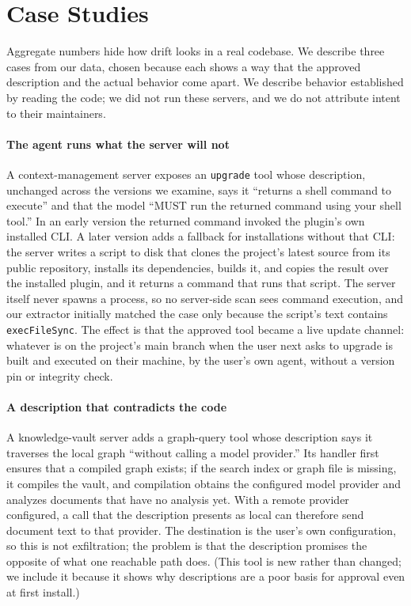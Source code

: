 \section{Case Studies}\label{sec:cases}

Aggregate numbers hide how drift looks in a real codebase. We describe three cases from our data, chosen because each shows a way that the approved description and the actual behavior come apart. We describe behavior established by reading the code; we did not run these servers, and we do not attribute intent to their maintainers. 

\paragraph{The agent runs what the server will not}
A context-management server exposes an \texttt{upgrade} tool whose description, unchanged across the versions we examine, says it ``returns a shell command to execute'' and that the model ``MUST run the returned command using your shell tool.'' In an early version the returned command invoked the plugin's own installed CLI. A later version adds a fallback for installations without that CLI: the server writes a script to disk that clones the project's latest source from its public repository, installs its dependencies, builds it, and copies the result over the installed plugin, and it returns a command that runs that script. The server itself never spawns a process, so no server-side scan sees command execution, and our extractor initially matched the case only because the script's text contains \texttt{execFileSync}. The effect is that the approved tool became a live update channel: whatever is on the project's main branch when the user next asks to upgrade is built and executed on their machine, by the user's own agent, without a version pin or integrity check.

\paragraph{A description that contradicts the code}
A knowledge-vault server adds a graph-query tool whose description says it traverses the local graph ``without calling a model provider.'' Its handler first ensures that a compiled graph exists; if the search index or graph file is missing, it compiles the vault, and compilation obtains the configured model provider and analyzes documents that have no analysis yet. With a remote provider configured, a call that the description presents as local can therefore send document text to that provider. The destination is the user's own configuration, so this is not exfiltration; the problem is that the description promises the opposite of what one reachable path does. (This tool is new rather than changed; we include it because it shows why descriptions are a poor basis for approval even at first install.)

